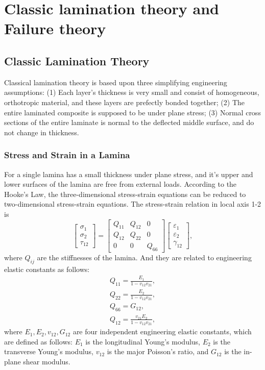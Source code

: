 \section{Classic lamination theory and Failure theory}

\subsection{Classic Lamination Theory}
Classical lamination theory is based upon three simplifying engineering
assumptions: (1) Each layer's thickness is very small and consist of
homogeneous, orthotropic material, and these layers are prefectly bonded
together; (2) The entire laminated composite is supposed to be under plane
stress; (3) Normal cross sections of the entire laminate is normal to the
deflected middle surface, and do not change in thickness.
\subsubsection{Stress and Strain in a Lamina}
For a single lamina has a small thickness under plane stress, and it's upper and lower surfaces of the lamina are
free from external loads. According to the Hooke's Law, the three-dimensional stress-strain equations can be reduced to
two-dimensional stress-strain equations. The stress-strain relation in local axis 1-2 is
\begin{equation}
	\left[
		\begin{array}{l}
        	\sigma _1\\
        	\sigma _2\\
        	\tau_{12}
    	\end{array}
	\right]
    =
	\left[
		\begin{array}{ccc}
        	Q_{11} & Q_{12} & 0\\
        	Q_{12} & Q_{22} & 0\\
        	0      & 0     & Q_{66}
    	\end{array}
	\right]
	\left[
		\begin{array}{l}
        	\varepsilon_1\\
        	\varepsilon_2\\
			\gamma_{12}
		\end{array} 
	\right]
	\textstyle{,}
\end{equation}
where $Q_{ij} $ are the stiffnesses of the lamina. And they are related to
engineering elastic constants as follows:
\begin{equation}
	\begin{array}{l}
		Q_{11}=\frac{E_1}{1-v_{12}v_{21}} \textstyle{,} \\
    	Q_{22}=\frac{E_2}{1-v_{12}v_{21}} \textstyle{,}\\
    	Q_{66}=G_{12} \textstyle{,}\\
    	Q_{12}=\frac{v_{21}E_2}{1-v_{12}v_{21}} \textstyle{,}
    \end{array}
\end{equation}
where $E_1, E_2, v_{12}, G_{12} $ are four independent engineering elastic
constants, which are defined as follows: $E_1 $ is the longitudinal Young's
modulus, $E_2 $ is the transverse Young's modulus, $v_{12} $ is the major
Poisson's ratio, and $G_{12} $ is the in-plane shear modulus.

